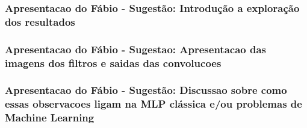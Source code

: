 \documentclass[11pt]{beamer}
\begin{document}
    
    \begin{frame}
      \frametitle{Apresentacao do Fábio - Sugestão: Introdução a exploração dos resultados}
    \end{frame}

    \begin{frame}
      \frametitle{Apresentacao do Fábio - Sugestao: Apresentacao das
        imagens dos filtros e saidas das convolucoes}
    \end{frame}

    \begin{frame}
      \frametitle{Apresentacao do Fábio - Sugestão: Discussao sobre
        como essas observacoes ligam na MLP clássica e/ou problemas de
        Machine Learning}
    \end{frame}
    
\end{document}
